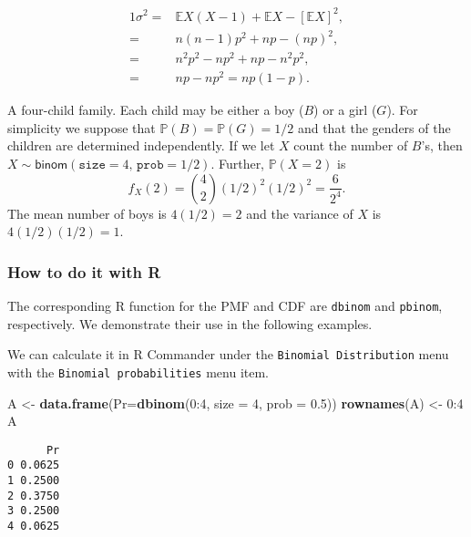 \documentclass[]{book}
\newenvironment{Shaded}{\begin{snugshade}}{\end{snugshade}}
\newcommand{\KeywordTok}[1]{\textcolor[rgb]{0.13,0.29,0.53}{\textbf{{#1}}}}
\newcommand{\DataTypeTok}[1]{\textcolor[rgb]{0.13,0.29,0.53}{{#1}}}
\newcommand{\DecValTok}[1]{\textcolor[rgb]{0.00,0.00,0.81}{{#1}}}
\newcommand{\FloatTok}[1]{\textcolor[rgb]{0.00,0.00,0.81}{{#1}}}
\newcommand{\StringTok}[1]{\textcolor[rgb]{0.31,0.60,0.02}{{#1}}}
\newcommand{\NormalTok}[1]{{#1}}
\numberwithin{equation}{chapter}
\numberwithin{figure}{chapter}
\theoremstyle{plain}
\theoremstyle{definition}
\theoremstyle{remark}
\theoremstyle{definition}
\theoremstyle{definition}
\theoremstyle{remark}
\let\BeginKnitrBlock\begin \let\EndKnitrBlock\end
\begin{document}
\begin{alignat*}{1}
\sigma^{2}= & \mathbb{E} X(X-1)+\mathbb{E} X-[\mathbb{E} X]^{2},\\
= & n(n-1)p^{2}+np-(np)^{2},\\
= & n^{2}p^{2}-np^{2}+np-n^{2}p^{2},\\
= & np-np^{2}=np(1-p).
\end{alignat*}

\BeginKnitrBlock{example}
\protect\hypertarget{ex:unnamed-chunk-205}{}{\label{ex:unnamed-chunk-205}}A
four-child family. Each child may be either a boy (\(B\)) or a girl
(\(G\)). For simplicity we suppose that
\(\mathbb{P}(B)=\mathbb{P}(G)=1/2\) and that the genders of the children
are determined independently. If we let \(X\) count the number of
\(B\)'s, then
\(X\sim\mathsf{binom}(\mathtt{size}=4,\,\mathtt{prob}=1/2)\). Further,
\(\mathbb{P}(X=2)\) is \[
f_{X}(2)={4 \choose 2}(1/2)^{2}(1/2)^{2}=\frac{6}{2^{4}}.
\] The mean number of boys is \(4(1/2)=2\) and the variance of \(X\) is
\(4(1/2)(1/2)=1\).
\EndKnitrBlock{example}

\subsubsection{How to do it with R}\label{how-to-do-it-with-r-21}

The corresponding R function for the PMF and CDF are \texttt{dbinom} and
\texttt{pbinom}, respectively. We demonstrate their use in the following
examples.

\bigskip

\BeginKnitrBlock{example}
\protect\hypertarget{ex:unnamed-chunk-206}{}{\label{ex:unnamed-chunk-206}}We
can calculate it in R Commander under the
\texttt{Binomial\ Distribution} menu with the
\texttt{Binomial\ probabilities} menu item.
\EndKnitrBlock{example}

\begin{Shaded}
\begin{Highlighting}[]
\NormalTok{A <-}\StringTok{ }\KeywordTok{data.frame}\NormalTok{(}\DataTypeTok{Pr=}\KeywordTok{dbinom}\NormalTok{(}\DecValTok{0}\NormalTok{:}\DecValTok{4}\NormalTok{, }\DataTypeTok{size =} \DecValTok{4}\NormalTok{, }\DataTypeTok{prob =} \FloatTok{0.5}\NormalTok{))}
\KeywordTok{rownames}\NormalTok{(A) <-}\StringTok{ }\DecValTok{0}\NormalTok{:}\DecValTok{4} 
\NormalTok{A}
\end{Highlighting}
\end{Shaded}

\begin{verbatim}
      Pr
0 0.0625
1 0.2500
2 0.3750
3 0.2500
4 0.0625
\end{verbatim}
\end{document}
